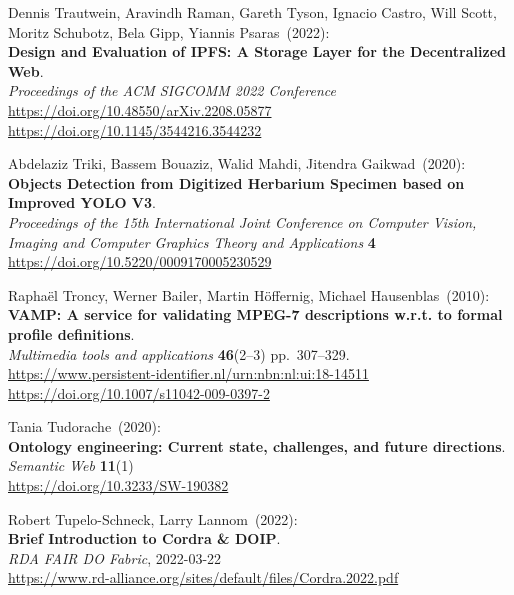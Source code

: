 \begin{thebibliography}{9}
Dennis Trautwein, Aravindh Raman, Gareth Tyson, Ignacio Castro, Will Scott, Moritz Schubotz, Bela Gipp, Yiannis Psaras~(2022): \\
\textbf{Design and Evaluation of IPFS: A Storage Layer for the Decentralized Web}.\\
\emph{Proceedings of the {ACM} {SIGCOMM} 2022 Conference}\\
\url{https://doi.org/10.48550/arXiv.2208.05877}\\
\url{https://doi.org/10.1145/3544216.3544232}

Abdelaziz Triki, Bassem Bouaziz, Walid Mahdi, Jitendra Gaikwad~(2020): \\
\textbf{Objects Detection from Digitized Herbarium Specimen based on Improved
YOLO V3}.\\
\emph{Proceedings of the 15th International Joint Conference on Computer Vision, Imaging and Computer Graphics Theory and Applications} 
\textbf{4}\\
\url{https://doi.org/10.5220/0009170005230529}

Raphaël Troncy, Werner Bailer, Martin Höffernig, Michael Hausenblas~(2010): \\
\textbf{VAMP: A service for validating MPEG-7 descriptions w.r.t. to
formal profile definitions}.\\
\emph{Multimedia tools and applications} \textbf{46}(2--3)
pp.~307--329.\\
\url{https://www.persistent-identifier.nl/urn:nbn:nl:ui:18-14511}\\
\url{https://doi.org/10.1007/s11042-009-0397-2}

Tania Tudorache~(2020): \\
\textbf{Ontology engineering: Current state, challenges, and future directions}.\\
\emph{Semantic Web} \textbf{11}(1)\\
\url{https://doi.org/10.3233/SW-190382}

Robert Tupelo-Schneck, Larry Lannom~(2022): \\
\textbf{Brief Introduction to Cordra \& DOIP}.\\
\emph{RDA FAIR DO Fabric}, 2022-03-22\\
\url{https://www.rd-alliance.org/sites/default/files/Cordra.2022.pdf}


\end{thebibliography}
